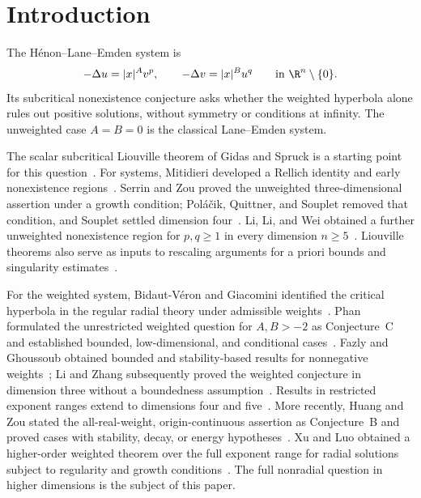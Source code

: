 \section{Introduction}\label{sec:introduction}

The H\'enon--Lane--Emden system is
\begin{equation}\label{eq:system}
 -\Delta u=|x|^A v^p,\qquad
 -\Delta v=|x|^B u^q
 \qquad\text{in }\R^n\setminus\{0\}.
\end{equation}
Its subcritical nonexistence conjecture asks whether the weighted
hyperbola alone rules out positive solutions, without symmetry or
conditions at infinity. The unweighted case \(A=B=0\) is the classical
Lane--Emden system.

The scalar subcritical Liouville theorem of Gidas and Spruck is a
starting point for this question~\cite{GidasSpruck1981}. For systems,
Mitidieri developed a Rellich identity and early nonexistence
regions~\cite{Mitidieri1993,Mitidieri1996}. Serrin and Zou proved the
unweighted three-dimensional assertion under a growth condition;
Pol\'a\v{c}ik, Quittner, and Souplet removed that condition, and
Souplet settled dimension four~\cite{SerrinZou1996,
PolacikQuittnerSouplet2007,Souplet2009}. Li, Li, and Wei obtained a
further unweighted nonexistence region for \(p,q\ge1\) in every dimension
\(n\ge5\)~\cite[Theorem~1.1]{LiLiWei2025}. Liouville theorems also serve
as inputs to rescaling arguments for a priori bounds and singularity
estimates~\cite{GidasSpruckBounds1981,PolacikQuittnerSouplet2007}.

For the weighted system, Bidaut-V\'eron and Giacomini identified the
critical hyperbola in the regular radial theory under admissible
weights~\cite{BidautVeronGiacomini2010}. Phan formulated the unrestricted
weighted question for \(A,B>-2\) as Conjecture~C and established
bounded, low-dimensional, and conditional cases~\cite{Phan}.
Fazly and Ghoussoub obtained bounded and stability-based results for
nonnegative weights~\cite{FazlyGhoussoub2014}; Li and Zhang subsequently
proved the weighted conjecture in dimension three without a boundedness
assumption~\cite{LiZhang2019}. Results in restricted exponent ranges
extend to dimensions four and five~\cite{Li2022}. More recently,
Huang and Zou stated the all-real-weight, origin-continuous assertion
as Conjecture~B and proved cases with stability, decay, or energy
hypotheses~\cite{HuangZou}. Xu and Luo obtained a higher-order weighted
theorem over the full exponent range for radial solutions subject to
regularity and growth conditions~\cite{XuLuo2026}. The full nonradial
question in higher dimensions is the subject of this paper.

